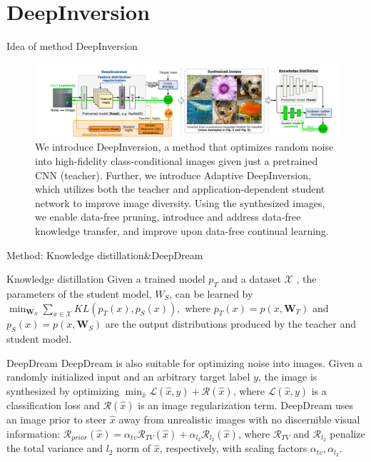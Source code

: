\documentclass{beamer}
\begin{document}
\section{DeepInversion}
\begin{frame}{Idea of method DeepInversion}
\begin{figure}
        \centering
        \includegraphics[scale=0.5]{images/distill_1.png}
        \caption{We introduce DeepInversion, a method that optimizes random noise into high-fidelity class-conditional images given just a pretrained CNN (teacher). Further, we introduce Adaptive DeepInversion, which utilizes both the teacher and application-dependent student network to improve image diversity. Using the synthesized images, we enable data-free pruning, introduce and address data-free knowledge transfer, and improve upon data-free continual learning.}
        \label{fig:enter-label}
    \end{figure}
\end{frame}

\begin{frame}{Method: Knowledge distillation\&DeepDream}
\begin{block}{Knowledge distillation}
Given a trained model $p_T$ and a dataset $\mathscr{X}$ , the parameters of the student model, $W_S$, can be learned by $\displaystyle\min_{\textbf{W}_S}\sum_{x \in \mathscr{X}} KL(p_T(x), p_S(x)),$ where $p_T(x) = p(x, \textbf{W}_T)$ and $p_S(x) = p(x, \textbf{W}_S)$ are the output distributions produced by the teacher and student model. 
\end{block}
\begin{block}{DeepDream}
DeepDream is also suitable for optimizing noise into images. Given a randomly initialized input and an arbitrary target label $y$, the image is synthesized by optimizing $\displaystyle\min_{\hat{x}} \mathscr{L}(\hat{x}, y) + \mathscr{R}(\hat{x})$, where $\mathscr{L}(\hat{x}, y)$ is a classification loss and
$\mathscr{R}(\hat{x})$ is an image regularization term. DeepDream uses an
image prior to steer $\hat{x}$ away from unrealistic images with no discernible visual information: $\mathscr{R}_{prior}(\hat{x}) = \alpha_{tv}\mathscr{R}_{TV}(\hat{x}) + \alpha_{l_2}\mathscr{R}_{l_2}(\hat{x})$, where $\mathscr{R}_{TV}$ and $\mathscr{R}_{l_2}$ penalize the total variance and $l_2$ norm
of $\hat{x}$, respectively, with scaling factors $\alpha_{tv}, \alpha_{l_2}$.
    
\end{block}
\end{frame}
\end{document}
